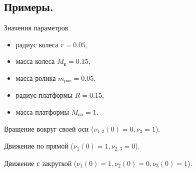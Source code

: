 \documentclass{beamer}
\begin{document}
\subsection{Примеры.}

\begin{frame}{Значения параметров}
    \begin{itemize}
        \item радиус колеса $r = 0.05$,
        \item масса колеса $ M_{\text{к}} = 0.15$, 
        \item масса ролика $m_{\text{рол}} = 0.05$, 
        \item радиус платформы $R = 0.15$, 
        \item масса платформы $M_{\text{пл}} = 1$.
    \end{itemize}
\end{frame}

\begin{frame}{Вращение вокруг своей оси ($\nu_{1,2}(0) = 0, \nu_3 = 1$).}
    
\end{frame}

\begin{frame}{Движение по прямой ($\nu_1(0) = 1, \nu_{2,3} = 0$).}
    
\end{frame}

\begin{frame}{Движение с закруткой ($\nu_1(0) = 1, \nu_2(0) = 0, \nu_3(0) = 1$).}
    
\end{frame}

\end{document}
